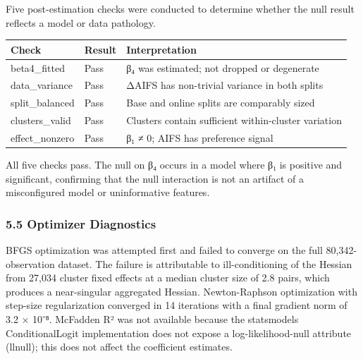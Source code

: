 Five post-estimation checks were conducted to determine whether the null result reflects a model or data pathology.

\begin{table}[htbp]
\centering
\begin{tabular}{lll}
\toprule
Check & Result & Interpretation \\
\midrule
beta4_fitted & Pass & β₄ was estimated; not dropped or degenerate \\
data_variance & Pass & ΔAIFS has non-trivial variance in both splits \\
split_balanced & Pass & Base and online splits are comparably sized \\
clusters_valid & Pass & Clusters contain sufficient within-cluster variation \\
effect_nonzero & Pass & β₁ ≠ 0; AIFS has preference signal \\
\bottomrule
\end{tabular}
\end{table}

All five checks pass. The null on β₄ occurs in a model where β₁ is positive and significant, confirming that the null interaction is not an artifact of a misconfigured model or uninformative features.

\subsubsection{5.5 Optimizer Diagnostics}

BFGS optimization was attempted first and failed to converge on the full 80,342-observation dataset. The failure is attributable to ill-conditioning of the Hessian from 27,034 cluster fixed effects at a median cluster size of 2.8 pairs, which produces a near-singular aggregated Hessian. Newton-Raphson optimization with step-size regularization converged in 14 iterations with a final gradient norm of 3.2 × 10⁻⁸. McFadden R² was not available because the statsmodels ConditionalLogit implementation does not expose a log-likelihood-null attribute (llnull); this does not affect the coefficient estimates.

